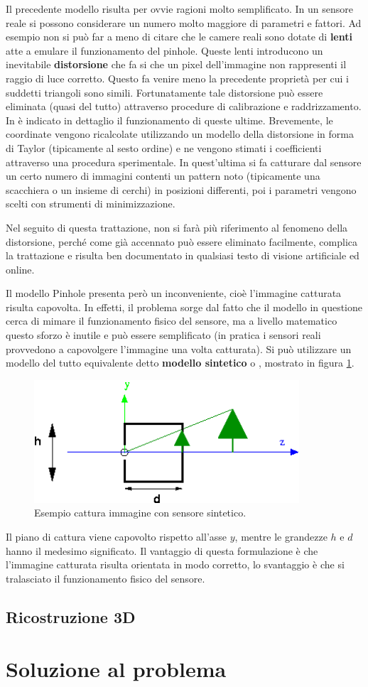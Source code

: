 Il precedente modello risulta per ovvie ragioni molto semplificato. In un sensore reale si possono considerare un numero molto maggiore di parametri e fattori. Ad esempio non si può far a meno di citare che le camere reali sono dotate di \textbf{lenti} atte a emulare il funzionamento del pinhole. Queste lenti introducono un inevitabile \textbf{distorsione} che fa si che un pixel dell'immagine non rappresenti il raggio di luce corretto. Questo fa venire meno la precedente proprietà per cui i suddetti triangoli sono simili. Fortunatamente tale distorsione può essere eliminata (quasi del tutto) attraverso procedure di calibrazione e raddrizzamento. In \cite{bib5} è indicato in dettaglio il funzionamento di queste ultime. Brevemente, le coordinate vengono ricalcolate utilizzando un modello della distorsione in forma di Taylor (tipicamente al sesto ordine) e ne vengono stimati i coefficienti attraverso una procedura sperimentale. In quest'ultima si fa catturare dal sensore un certo numero di immagini contenti un pattern noto (tipicamente una scacchiera o un insieme di cerchi) in posizioni differenti, poi i parametri vengono scelti con strumenti di minimizzazione.

Nel seguito di questa trattazione, non si farà più riferimento al fenomeno della distorsione, perché come già accennato può essere eliminato facilmente, complica la trattazione e risulta ben documentato in qualsiasi testo di visione artificiale ed online. 

Il modello Pinhole presenta però un inconveniente, cioè l'immagine catturata risulta capovolta. In effetti, il problema sorge dal fatto che il modello in questione cerca di mimare il funzionamento fisico del sensore, ma a livello matematico questo sforzo è inutile e può essere semplificato (in pratica i sensori reali provvedono a capovolgere l'immagine una volta catturata).
Si può utilizzare un modello del tutto equivalente detto \textbf{modello sintetico} o , mostrato in figura \ref{vis:stereo:virtuale}.
\begin{figure}[h!]
	\centering
	\includegraphics[width=280pt]{imgs/synthetic-and-tree.png}
	\caption{Esempio cattura immagine con sensore sintetico.}
	\label{vis:stereo:virtuale}
\end{figure} 
Il piano di cattura viene capovolto rispetto all'asse $y$, mentre le grandezze $h$ e $d$ hanno il medesimo significato. Il vantaggio di questa formulazione è che l'immagine catturata risulta orientata in modo corretto, lo svantaggio è che si tralasciato il funzionamento fisico del sensore.
\subsection{Ricostruzione 3D}
\label{sec:stereo:ric3d}


\section{Soluzione al problema}
\label{sec:vision:solution}


